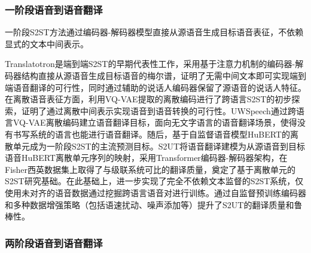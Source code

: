 \begin{figure}[htbp]
\label{fig:rw_s2st}
\end{figure}

\subsubsection{一阶段语音到语音翻译}\label{sec:rw_s2st_1pass}

一阶段S2ST方法通过编码器-解码器模型直接从源语音生成目标语音表征，不依赖显式的文本中间表示。

Translatotron\citep{translatotron}是端到端S2ST的早期代表性工作，采用基于注意力机制的编码器-解码器结构直接从源语音生成目标语音的梅尔谱，证明了无需中间文本即可实现端到端语音翻译的可行性，同时通过辅助的说话人编码器保留了源语音的说话人特征。在离散语音表征方面，\citet{tjandra2019s2st}利用VQ-VAE提取的离散编码进行了跨语言S2ST的初步探索，证明了通过离散中间表示实现语音到语音转换的可行性。UWSpeech\citep{uwspeech}通过跨语言VQ-VAE离散编码建立语音翻译目标，面向无文字语言的语音翻译场景，使得没有书写系统的语言也能进行语音翻译。随后，基于自监督语音模型HuBERT的离散单元成为一阶段S2ST的主流预测目标。S2UT\citep{s2ut}将语音翻译建模为从源语音到目标语音HuBERT离散单元序列的映射，采用Transformer编码器-解码器架构，在Fisher西英数据集上取得了与级联系统可比的翻译质量，奠定了基于离散单元的S2ST研究基础。在此基础上，\citet{lee-etal-2022-textless}进一步实现了完全不依赖文本监督的S2ST系统，仅使用未对齐的语音数据通过挖掘跨语言语音对进行训练。\citet{DBLP:conf/interspeech/PopuriCWPAGHL22}通过自监督预训练编码器和多种数据增强策略（包括语速扰动、噪声添加等）提升了S2UT的翻译质量和鲁棒性。

\subsubsection{两阶段语音到语音翻译}\label{sec:rw_s2st_2pass}

